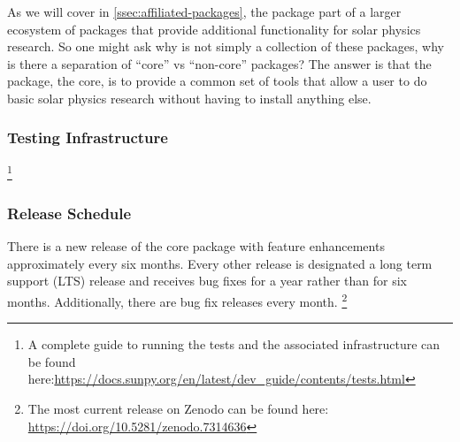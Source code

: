 As we will cover in \ref{ssec:affiliated-packages}, the \sunpypkg package part of a larger ecosystem of packages that provide additional functionality for solar physics research.
So one might ask why \sunpypkg is not simply a collection of these packages, why is there a separation of \enquote{core} vs \enquote{non-core} packages?
The answer is that the \sunpypkg package, the core, is to provide a common set of tools that allow a user to do basic solar physics research without having to install anything else.

\subsubsection{Testing Infrastructure}
\label{sssec:testing-infrastructure}

\footnote{A complete guide to running the tests and the associated infrastructure can be found here:\url{https://docs.sunpy.org/en/latest/dev_guide/contents/tests.html}}

\subsubsection{Release Schedule}
\label{sssec:release-schedule}

There is a new release of the core package with feature enhancements approximately every six months.
Every other release is designated a long term support (LTS) release and receives bug fixes for a year rather than for six months.
Additionally, there are bug fix releases every month.
\footnote{The most current release on Zenodo can be found here: \url{https://doi.org/10.5281/zenodo.7314636}}

